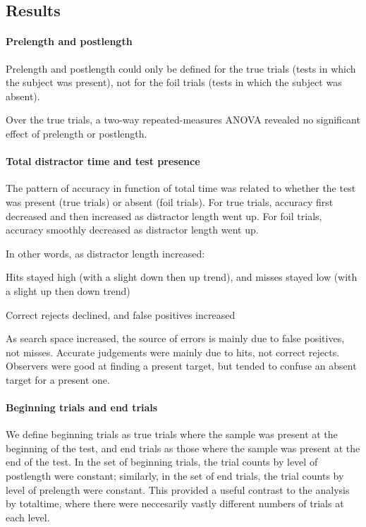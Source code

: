 \subsection{Results}

\paragraph{Prelength and postlength}

Prelength and postlength could only be defined for the true trials (tests in which the subject was present), not for the foil trials (tests in which the subject was absent).

Over the true trials, a two-way repeated-measures ANOVA revealed no significant effect of prelength or postlength.

\paragraph{Total distractor time and test presence}

The pattern of accuracy in function of total time was related to whether the test was present (true trials) or absent (foil trials). For true trials, accuracy first decreased and then increased as distractor length went up. For foil trials, accuracy smoothly decreased as distractor length went up.

In other words, as distractor length increased:
\begin{itemise}
\item Hits stayed high (with a slight down then up trend), and misses stayed low (with a slight up then down trend)
\item Correct rejects declined, and false positives increased
\end{itemise}

As search space increased, the source of errors is mainly due to false positives, not misses. Accurate judgements were mainly due to hits, not correct rejects. Observers were good at finding a present target, but tended to confuse an absent target for a present one.



\paragraph{Beginning trials and end trials}

We define beginning trials as true trials where the sample was present at the beginning of the test, and end trials as those where the sample was present at the end of the test. In the set of beginning trials, the trial counts by level of postlength were constant; similarly, in the set of end trials, the trial counts by level of prelength were constant. This provided a useful contrast to the analysis by totaltime, where there were neccesarily vastly different numbers of trials at each level.


